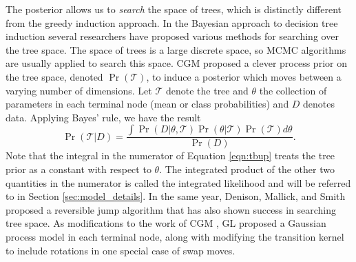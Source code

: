  The posterior allows us to \emph{search} the space of trees, which is distinctly different from the greedy induction approach. In the Bayesian approach to decision tree induction several researchers have proposed various methods for searching over the tree space. The space of trees is a large discrete space, so MCMC algorithms are usually applied to search this space. CGM  \cite{chipman1998bayesian} proposed a clever process prior on the tree space, denoted $\Pr(\mathcal{T})$, to induce a posterior which moves between a varying number of dimensions. 
  Let $\mathcal{T}$ denote the tree and $\theta$ the collection of parameters in each terminal node (mean or class probabilities) and $D$ denotes data. Applying Bayes' rule, we have the result 
 \begin{equation}
 \label{eqn:tbup}
 \Pr(\mathcal{T}\vert D) = \frac{\int\Pr(D \vert \theta, \mathcal{T})\Pr(\theta\vert \mathcal{T})\Pr(\mathcal{T})d\theta}{\Pr(D)}.
 \end{equation}
 Note that the integral in the numerator of Equation \ref{eqn:tbup} treats the tree prior as a constant with respect to $\theta$. The integrated product of the other two quantities in the numerator is called the integrated likelihood and will be referred to in Section \ref{sec:model_details}. In the same year, Denison, Mallick, and Smith \cite{denison1998bayesian} proposed a reversible jump algorithm that has also shown success in searching tree space. As modifications to the work of CGM \cite{chipman1998bayesian}, GL \cite{gramacy2008bayesian} proposed a Gaussian process model in each terminal node, along with modifying the transition kernel to include rotations in one special case of swap moves. 

